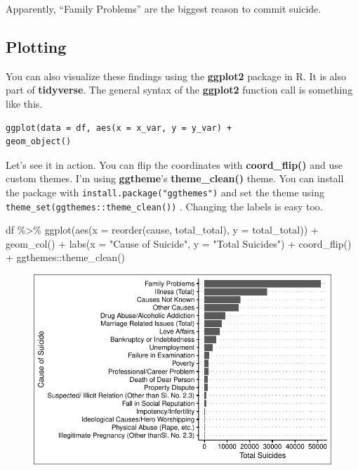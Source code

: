 \documentclass[
  letterpaper,
  DIV=11,
  numbers=noendperiod]{scrartcl}
\newenvironment{Shaded}{\begin{snugshade}}{\end{snugshade}}
\newcommand{\AttributeTok}[1]{\textcolor[rgb]{0.40,0.45,0.13}{#1}}
\newcommand{\FunctionTok}[1]{\textcolor[rgb]{0.28,0.35,0.67}{#1}}
\newcommand{\NormalTok}[1]{\textcolor[rgb]{0.00,0.23,0.31}{#1}}
\newcommand{\SpecialCharTok}[1]{\textcolor[rgb]{0.37,0.37,0.37}{#1}}
\newcommand{\StringTok}[1]{\textcolor[rgb]{0.13,0.47,0.30}{#1}}
\begin{document}
Apparently, ``Family Problems'' are the biggest reason to commit
suicide.

\hypertarget{plotting}{%
\subsection{Plotting}\label{plotting}}

You can also visualize these findings using the \textbf{ggplot2} package
in R. It is also part of \textbf{tidyverse}. The general syntax of the
\textbf{ggplot2} function call is something like this.

\begin{verbatim}
ggplot(data = df, aes(x = x_var, y = y_var) +
geom_object()
\end{verbatim}

Let's see it in action. You can flip the coordinates with
\textbf{coord\_flip()} and use custom themes. I'm using
\textbf{ggtheme}'s \textbf{theme\_clean()} theme. You can install the
package with \texttt{install.package("ggthemes")} and set the theme
using \texttt{theme\_set(ggthemes::theme\_clean())} . Changing the
labels is easy too.

\begin{Shaded}
\begin{Highlighting}[]
\NormalTok{df }\SpecialCharTok{\%\textgreater{}\%} 
   \FunctionTok{ggplot}\NormalTok{(}\FunctionTok{aes}\NormalTok{(}\AttributeTok{x =} \FunctionTok{reorder}\NormalTok{(cause, total\_total), }\AttributeTok{y =}\NormalTok{ total\_total)) }\SpecialCharTok{+}
   \FunctionTok{geom\_col}\NormalTok{() }\SpecialCharTok{+}
   \FunctionTok{labs}\NormalTok{(}\AttributeTok{x =} \StringTok{"Cause of Suicide"}\NormalTok{, }\AttributeTok{y =} \StringTok{"Total Suicides"}\NormalTok{) }\SpecialCharTok{+}
   \FunctionTok{coord\_flip}\NormalTok{() }\SpecialCharTok{+}
\NormalTok{   ggthemes}\SpecialCharTok{::}\FunctionTok{theme\_clean}\NormalTok{()}
\end{Highlighting}
\end{Shaded}

\begin{figure}[H]

{\centering \includegraphics{file_files/figure-pdf/unnamed-chunk-7-1.pdf}

}

\end{figure}
\end{document}
